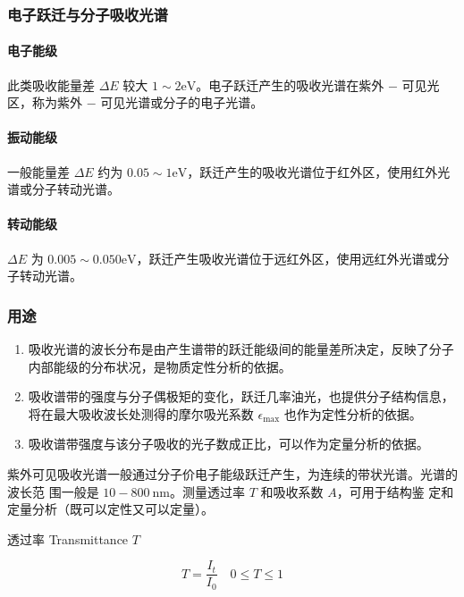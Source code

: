 \subsubsection{电子跃迁与分子吸收光谱}

\paragraph{电子能级} 此类吸收能量差 $\Delta E$ 较大 $1 \sim 2 \mathrm{eV}$。电子跃迁产生的吸收光谱在紫外 $-$ 可见光区，称为紫外 $-$ 可见光谱或分子的电子光谱。

\paragraph{振动能级} 一般能量差 $\Delta E$ 约为 $ 0.05 \sim 1 \mathrm{eV}$，跃迁产生的吸收光谱位于红外区，使用红外光谱或分子转动光谱。

\paragraph{转动能级} $\Delta E$ 为 $0.005 \sim 0.050 \mathrm{eV}$，跃迁产生吸收光谱位于远红外区，使用远红外光谱或分子转动光谱。

\subsubsection{用途}

\begin{enumerate}
    \item 吸收光谱的波长分布是由产生谱带的跃迁能级间的能量差所决定，反映了分子内部能级的分布状况，是物质定性分析的依据。
    \item 吸收谱带的强度与分子偶极矩的变化，跃迁几率油光，也提供分子结构信息，将在最大吸收波长处测得的摩尔吸光系数 $\epsilon_{\max}$ 也作为定性分析的依据。
    \item 吸收谱带强度与该分子吸收的光子数成正比，可以作为定量分析的依据。
\end{enumerate}

紫外可见吸收光谱一般通过分子价电子能级跃迁产生，为连续的带状光谱。光谱的波长范
围一般是 $10 - 800 \ \mathrm{nm}$。测量透过率 $T$ 和吸收系数 $A$，可用于结构鉴
定和定量分析（既可以定性又可以定量）。

透过率 Transmittance $T$

\begin{equation}
    T = \frac{I_t}{I_0} \quad 0 \leq T \le 1
\end{equation}


